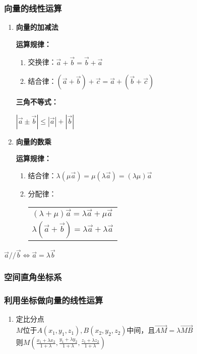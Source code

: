 \documentclass{article} %
\begin{document}
\subsubsection{向量的线性运算}
\begin{enumerate}
\item \textbf{向量的加减法}\par
\textbf{运算规律：}\par
\begin{enumerate}
    \item 交换律：$\overrightarrow{a}+\overrightarrow{b}=\overrightarrow{b}+\overrightarrow{a}$
    \item 结合律：$(\overrightarrow{a}+\overrightarrow{b})+\overrightarrow{c}
    =\overrightarrow{a}+(\overrightarrow{b}+\overrightarrow{c})$
\end{enumerate}
\textbf{三角不等式：}\par
$|\overrightarrow{a}\pm \overrightarrow{b}|\leq 
|\overrightarrow{a}|+|\overrightarrow{b}|
$

\item \textbf{向量的数乘}\par
\textbf{运算规律：}\par
\begin{enumerate}
    \item 结合律：$\lambda(\mu\overrightarrow{a})
    =\mu(\lambda\overrightarrow{a})
    =(\lambda\mu)\overrightarrow{a}
    $
    \item 分配律：\begin{tabular}{l}
        $(\lambda+\mu) \overrightarrow{a}=\lambda\overrightarrow{a}+\mu \overrightarrow{a}$\\
        $\lambda(\overrightarrow{a}+\overrightarrow{b})=\lambda\overrightarrow{a}+\lambda \overrightarrow{a}$
    \end{tabular}
\end{enumerate}
\end{enumerate}

$\overrightarrow{a}//\overrightarrow{b}\Leftrightarrow \overrightarrow{a}=\lambda\overrightarrow{b}$

\subsubsection{空间直角坐标系}

\subsubsection{利用坐标做向量的线性运算}
\begin{enumerate}
    \item 定比分点\\$M$位于$A(x_1,y_1,z_1),B(x_2,y_2,z_2)$中间，且$\overrightarrow{AM}=\lambda\overrightarrow{MB}$\\
    则$M(\frac{x_1+\lambda x_2}{1+\lambda},\frac{y_1+\lambda y_2}{1+\lambda},\frac{z_1+\lambda z_2}{1+\lambda})$
\end{enumerate}
\end{document}
